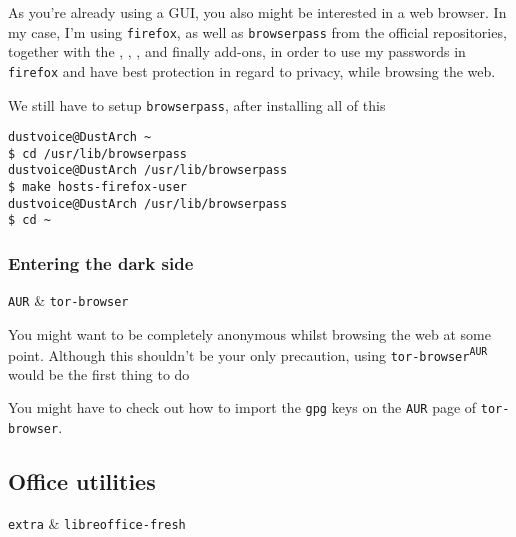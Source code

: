 \documentclass[10pt]{dustdoc}
\begin{document}
As you’re already using a GUI, you also might be interested in a web browser.
In my case, I’m using \texttt{firefox}, as well as \texttt{browserpass} from the official repositories, together with the , , ,  and finally  add-ons, in order to use my passwords in \texttt{firefox} and have best protection in regard to privacy, while browsing the web.

We still have to setup \texttt{browserpass}, after installing all of this

\begin{verbatim}
dustvoice@DustArch ~
$ cd /usr/lib/browserpass
dustvoice@DustArch /usr/lib/browserpass
$ make hosts-firefox-user
dustvoice@DustArch /usr/lib/browserpass
$ cd ~
\end{verbatim}

\subsubsection{Entering the dark side}
\label{sec:entering-the-dark-side}

\begin{packagetable}
    \texttt{AUR} & \texttt{tor-browser} \\
\end{packagetable}

You might want to be completely anonymous whilst browsing the web at some point.
Although this shouldn’t be your only precaution, using \texttt{tor-browser\textsuperscript{\texttt{AUR}}} would be the first thing to do

\begin{NOTE}
    You might have to check out how to import the \texttt{gpg} keys on the \texttt{AUR} page of \texttt{tor-browser}.
\end{NOTE}

\subsection{Office utilities}
\label{sec:office-utilities}

\begin{packagetable}
    \texttt{extra} & \texttt{libreoffice-fresh} \\
\end{packagetable}
\end{document}

